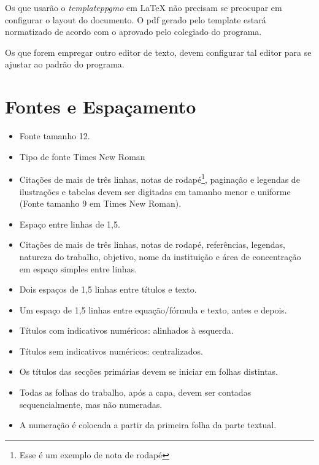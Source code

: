 \documentclass{templateppgmo}
\numberwithin{figure}{chapter}
\numberwithin{table}{chapter}
\numberwithin{quadro}{chapter}
\numberwithin{algoritmo}{chapter}
\numberwithin{codigo}{chapter}
\begin{document}
Os que usarão o \emph{templateppgmo} em \LaTeX\; não precisam se preocupar em configurar o layout do documento. O pdf gerado pelo template estará normatizado de acordo com o aprovado pelo colegiado do programa.

Os que forem empregar outro editor de texto, devem configurar tal editor para se ajustar ao padrão do programa.


\section{Fontes e Espaçamento}

\begin{itemize}
\item Fonte tamanho 12.

\item Tipo de fonte Times New Roman

\item Citações de mais de três linhas, notas de rodapé\footnote{Esse é um exemplo de nota de rodapé}, paginação e legendas de ilustrações e tabelas devem ser digitadas em tamanho menor e uniforme (Fonte tamanho 9 em Times New Roman).

\item Espaço entre linhas de 1,5.

\item Citações de mais de três linhas, notas de rodapé, referências, legendas, natureza do trabalho, objetivo, nome da instituição e área de concentração em espaço simples entre linhas.

\item Dois espaços de 1,5 linhas entre títulos e texto. 

\item Um espaço de 1,5 linhas entre equação/fórmula e texto, antes e depois.

\item Títulos com indicativos numéricos: alinhados à esquerda.

\item Títulos sem indicativos numéricos: centralizados. 

\item Os títulos das secções primárias devem se iniciar em folhas distintas.

\item Todas as folhas do trabalho, após a capa, devem ser contadas sequencialmente, mas não numeradas. 

\item A numeração é colocada a partir da primeira folha da parte textual. 


\end{itemize}
\end{document}
